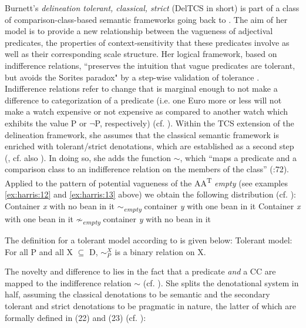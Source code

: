 \documentclass[output=paper]{langsci/langscibook}
\begin{document}
Burnett's \textit{delineation tolerant, classical, strict} (DelTCS in short) is part of a class of comparison-class-based semantic frameworks going back to
\citet{Klein:1980}. The aim of her model is to provide a new relationship between the vagueness of adjectival predicates, the properties of context-sensitivity that these predicates involve as well as their corresponding scale structure. Her logical framework, based on indifference relations, ``preserves the intuition that vague predicates are tolerant, but avoids the Sorites paradox" by a step-wise validation of tolerance \citep[28]{Burnett2017}. Indifference relations refer to change that is marginal enough to not make a difference to categorization of a predicate (i.e. one Euro more or less will not make a watch expensive or not expensive as compared to another watch which exhibits the value P or $\neg$P, respectively) (cf. \citealt[1]{Burnett2017}). Within the TCS extension of the delineation framework, she assumes that the classical semantic framework is enriched with tolerant\slash strict denotations, which are established as a second step (\citealt[72]{Burnett2017}, cf. also \citealt{Cobreros2012}). In doing so, she adds the function $\sim$, which ``maps a predicate and a comparison class to an indifference relation on the members of the class'' (\citeyear{Burnett2017}:72). Applied to the pattern of potential vagueness of the AA\textsuperscript{T} \textit{empty} (see examples \ref{ex:harris:12} and \ref{ex:harris:13} above) we obtain the following distribution (cf. \citealt[76]{Burnett2017}):
\ea
	Container \textit{x} with no bean in it $\sim$\textsubscript{\textit{empty}} container \textit{y} with one bean in it
\ex
	Container \textit{x} with one bean in it $\not\sim$\textsubscript{\textit{empty}} container \textit{y} with no bean in it
\z

The definition for a tolerant model according to \textcite[72]{Burnett2017} is given below:
\ea
	Tolerant model: For all P and all X $\subseteq$ D, $\sim_P^X$ is a binary relation on X.
\z

The novelty and difference to \citet{Cobreros2012} lies in the fact that a predicate \textit{and} a CC are mapped to the indifference relation $\sim$ (cf. \citealt[72]{Burnett2017}).
She splits the denotational system in half, assuming the classical denotations to be semantic and the secondary tolerant and strict denotations to be pragmatic in nature, the latter of which are formally defined in (22) and (23) (cf. \citealt[73]{Burnett2017}):
\end{document}
